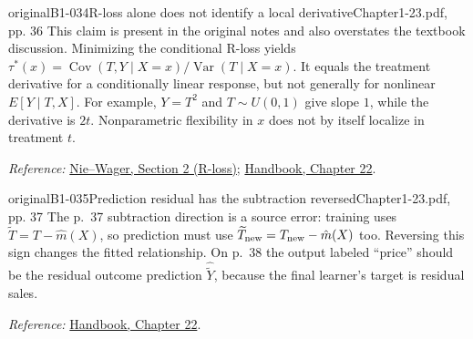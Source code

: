 {\begin{reviewnote}{original}{B1-034}{R-loss alone does not identify a local derivative}{Chapter1-23.pdf, pp. 36}
This claim is present in the original notes and also overstates the textbook discussion. Minimizing the conditional R-loss yields $\tau^*(x)=\operatorname{Cov}(T,Y\mid X=x)/\operatorname{Var}(T\mid X=x)$. It equals the treatment derivative for a conditionally linear response, but not generally for nonlinear $E[Y\mid T,X]$. For example, $Y=T^2$ and $T\sim U(0,1)$ give slope $1$, while the derivative is $2t$. Nonparametric flexibility in $x$ does not by itself localize in treatment $t$.
\par\smallskip\textit{Reference:} \href{https://arxiv.org/html/1712.04912v4#S2}{Nie--Wager, Section 2 (R-loss)}; \href{https://matheusfacure.github.io/python-causality-handbook/22-Debiased-Orthogonal-Machine-Learning.html}{Handbook, Chapter 22}.
\end{reviewnote}

\begin{reviewnote}{original}{B1-035}{Prediction residual has the subtraction reversed}{Chapter1-23.pdf, pp. 37}
The p.~37 subtraction direction is a source error: training uses $\widetilde T=T-\hat m(X)$, so prediction must use $\widetilde T_{\rm new}=T_{\rm new}-\hat m(X)$ too. Reversing this sign changes the fitted relationship. On p.~38 the output labeled ``price'' should be the residual outcome prediction $\widehat{\widetilde Y}$, because the final learner's target is residual sales.
\par\smallskip\textit{Reference:} \href{https://matheusfacure.github.io/python-causality-handbook/22-Debiased-Orthogonal-Machine-Learning.html}{Handbook, Chapter 22}.
\end{reviewnote}

}
